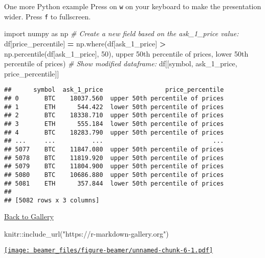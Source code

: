 \documentclass[
  ignorenonframetext,
]{beamer}
\newenvironment{Shaded}{\begin{snugshade}}{\end{snugshade}}
\newcommand{\CommentTok}[1]{\textcolor[rgb]{0.56,0.35,0.01}{\textit{#1}}}
\newcommand{\DecValTok}[1]{\textcolor[rgb]{0.00,0.00,0.81}{#1}}
\newcommand{\FunctionTok}[1]{\textcolor[rgb]{0.00,0.00,0.00}{#1}}
\newcommand{\ImportTok}[1]{#1}
\newcommand{\NormalTok}[1]{#1}
\newcommand{\OperatorTok}[1]{\textcolor[rgb]{0.81,0.36,0.00}{\textbf{#1}}}
\newcommand{\SpecialCharTok}[1]{\textcolor[rgb]{0.00,0.00,0.00}{#1}}
\newcommand{\StringTok}[1]{\textcolor[rgb]{0.31,0.60,0.02}{#1}}
\begin{document}
\begin{frame}[fragile]{One more Python example}
\protect\hypertarget{one-more-python-example}{}
Press on \texttt{w} on your keyboard to make the presentation wider.
Press \texttt{f} to fullscreen.

\begin{Shaded}
\begin{Highlighting}[]
\ImportTok{import}\NormalTok{ numpy }\ImportTok{as}\NormalTok{ np}
\CommentTok{\# Create a new field based on the ask\_1\_price value:}
\NormalTok{df[}\StringTok{\textquotesingle{}price\_percentile\textquotesingle{}}\NormalTok{] }\OperatorTok{=}\NormalTok{ np.where(df[}\StringTok{\textquotesingle{}ask\_1\_price\textquotesingle{}}\NormalTok{] }\OperatorTok{\textgreater{}}\NormalTok{ np.percentile(df[}\StringTok{\textquotesingle{}ask\_1\_price\textquotesingle{}}\NormalTok{], }\DecValTok{50}\NormalTok{),}
                            \StringTok{\textquotesingle{}upper 50th percentile of prices\textquotesingle{}}\NormalTok{, }
                            \StringTok{\textquotesingle{}lower 50th percentile of prices\textquotesingle{}}\NormalTok{)}
\CommentTok{\# Show modified dataframe:}
\NormalTok{df[[}\StringTok{\textquotesingle{}symbol\textquotesingle{}}\NormalTok{, }\StringTok{\textquotesingle{}ask\_1\_price\textquotesingle{}}\NormalTok{, }\StringTok{\textquotesingle{}price\_percentile\textquotesingle{}}\NormalTok{]]}
\end{Highlighting}
\end{Shaded}

\begin{verbatim}
##      symbol  ask_1_price                 price_percentile
## 0       BTC    18037.560  upper 50th percentile of prices
## 1       ETH      544.422  lower 50th percentile of prices
## 2       BTC    18338.710  upper 50th percentile of prices
## 3       ETH      555.184  lower 50th percentile of prices
## 4       BTC    18283.790  upper 50th percentile of prices
## ...     ...          ...                              ...
## 5077    BTC    11847.080  upper 50th percentile of prices
## 5078    BTC    11819.920  upper 50th percentile of prices
## 5079    BTC    11804.900  upper 50th percentile of prices
## 5080    BTC    10686.880  upper 50th percentile of prices
## 5081    ETH      357.844  lower 50th percentile of prices
## 
## [5082 rows x 3 columns]
\end{verbatim}
\end{frame}

\begin{frame}[fragile]{\href{https://r-markdown-gallery.org}{Back to
Gallery}}
\protect\hypertarget{back-to-gallery}{}
\begin{Shaded}
\begin{Highlighting}[]
\NormalTok{knitr}\SpecialCharTok{::}\FunctionTok{include\_url}\NormalTok{(}\StringTok{"https://r{-}markdown{-}gallery.org"}\NormalTok{)}
\end{Highlighting}
\end{Shaded}

\href{https://r-markdown-gallery.org}{\texttt{[image: beamer\_files/figure-beamer/unnamed-chunk-6-1.pdf]}}
\end{frame}
\end{document}
